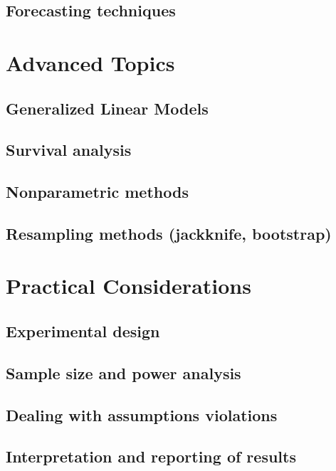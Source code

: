 \documentclass{article}
\begin{document}
  \subsection{Forecasting techniques}

\section{Advanced Topics}

  \subsection{Generalized Linear Models}

  \subsection{Survival analysis}

  \subsection{Nonparametric methods}

  \subsection{Resampling methods (jackknife, bootstrap)}

\section{Practical Considerations}

  \subsection{Experimental design}

  \subsection{Sample size and power analysis}

  \subsection{Dealing with assumptions violations}

  \subsection{Interpretation and reporting of results}
\end{document}
